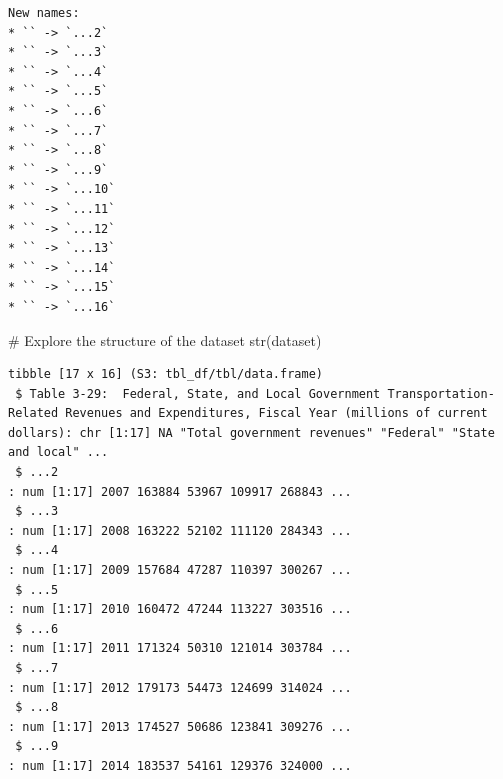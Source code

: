 \documentclass[
  letterpaper,
  DIV=11,
  numbers=noendperiod]{scrreprt}
\newenvironment{Shaded}{\begin{snugshade}}{\end{snugshade}}
\newcommand{\CommentTok}[1]{\textcolor[rgb]{0.37,0.37,0.37}{#1}}
\newcommand{\FunctionTok}[1]{\textcolor[rgb]{0.28,0.35,0.67}{#1}}
\newcommand{\NormalTok}[1]{\textcolor[rgb]{0.00,0.23,0.31}{#1}}
\begin{document}
\begin{verbatim}
New names:
* `` -> `...2`
* `` -> `...3`
* `` -> `...4`
* `` -> `...5`
* `` -> `...6`
* `` -> `...7`
* `` -> `...8`
* `` -> `...9`
* `` -> `...10`
* `` -> `...11`
* `` -> `...12`
* `` -> `...13`
* `` -> `...14`
* `` -> `...15`
* `` -> `...16`
\end{verbatim}

\begin{Shaded}
\begin{Highlighting}[]
\CommentTok{\# Explore the structure of the dataset}
\FunctionTok{str}\NormalTok{(dataset)}
\end{Highlighting}
\end{Shaded}

\begin{verbatim}
tibble [17 x 16] (S3: tbl_df/tbl/data.frame)
 $ Table 3-29:  Federal, State, and Local Government Transportation-Related Revenues and Expenditures, Fiscal Year (millions of current dollars): chr [1:17] NA "Total government revenues" "Federal" "State and local" ...
 $ ...2                                                                                                                                         : num [1:17] 2007 163884 53967 109917 268843 ...
 $ ...3                                                                                                                                         : num [1:17] 2008 163222 52102 111120 284343 ...
 $ ...4                                                                                                                                         : num [1:17] 2009 157684 47287 110397 300267 ...
 $ ...5                                                                                                                                         : num [1:17] 2010 160472 47244 113227 303516 ...
 $ ...6                                                                                                                                         : num [1:17] 2011 171324 50310 121014 303784 ...
 $ ...7                                                                                                                                         : num [1:17] 2012 179173 54473 124699 314024 ...
 $ ...8                                                                                                                                         : num [1:17] 2013 174527 50686 123841 309276 ...
 $ ...9                                                                                                                                         : num [1:17] 2014 183537 54161 129376 324000 ...

\end{verbatim}
\end{document}
